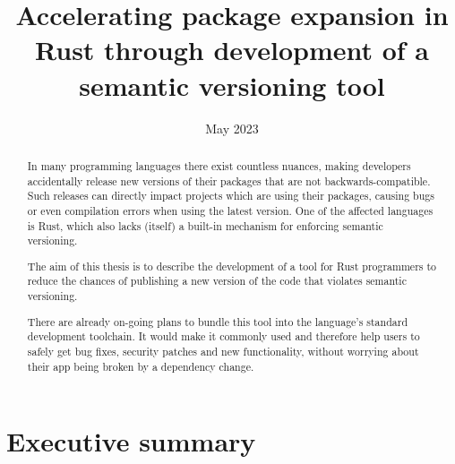 \documentclass[licencjacka,en]{pracamgr}
\date{May 2023}
\title{Accelerating package expansion in Rust through development of a semantic versioning tool}
\begin{document}
\maketitle

\begin{abstract}
In many programming languages there exist countless nuances,
making developers accidentally release new versions of their packages
that are not backwards-compatible.
Such releases can directly impact projects which are using their packages,
causing bugs or even compilation errors when using the latest version.
One of the affected languages is Rust,
which also lacks (itself) a built-in mechanism for enforcing semantic versioning.

The aim of this thesis is to describe the development of a tool
for Rust programmers to reduce the chances of publishing
a new version of the code that violates semantic versioning.

There are already on-going plans to bundle this tool
into the language's standard development toolchain.
It would make it commonly used and therefore help users to safely get bug fixes,
security patches and new functionality,
without worrying about their app being broken by a dependency change.
\end{abstract}




\tableofcontents

\chapter*{Executive summary}
\end{document}
